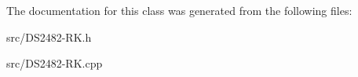 The documentation for this class was generated from the following files\+:\begin{DoxyCompactItemize}
\item 
src/D\+S2482-\/\+R\+K.\+h\item 
src/D\+S2482-\/\+R\+K.\+cpp\end{DoxyCompactItemize}
